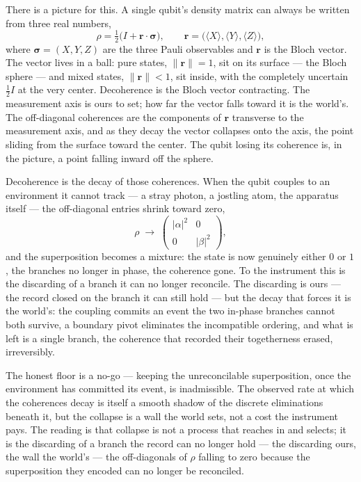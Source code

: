 There is a picture for this. A single qubit's density matrix can always be written from three real numbers,
\begin{equation}
  \rho = \tfrac12\bigl(I + \mathbf{r}\cdot\boldsymbol{\sigma}\bigr), \qquad
  \mathbf{r} = \bigl(\langle X\rangle, \langle Y\rangle, \langle Z\rangle\bigr),
\end{equation}
where $\boldsymbol{\sigma} = (X, Y, Z)$ are the three Pauli observables and $\mathbf{r}$ is the Bloch vector.
The vector lives in a ball: pure states, $\lVert\mathbf{r}\rVert = 1$, sit on its surface --- the Bloch
sphere --- and mixed states, $\lVert\mathbf{r}\rVert < 1$, sit inside, with the completely uncertain $\tfrac12
I$ at the very center. Decoherence is the Bloch vector contracting. The measurement axis is ours to set; how far the vector falls
toward it is the world's. The off-diagonal coherences are the components of $\mathbf{r}$ transverse to the
measurement axis, and as they decay the vector collapses onto the axis, the point sliding from the surface
toward the center. The qubit losing its coherence is, in the
picture, a point falling inward off the sphere.

Decoherence is the decay of those coherences. When the qubit couples to an environment it cannot track --- a
stray photon, a jostling atom, the apparatus itself --- the off-diagonal entries shrink toward zero,
\begin{equation}
  \rho \;\longrightarrow\;
  \begin{pmatrix} |\alpha|^2 & 0 \\ 0 & |\beta|^2 \end{pmatrix},
\end{equation}
and the superposition becomes a mixture: the state is now genuinely either $0$ or $1$, the branches no longer
in phase, the coherence gone. To the instrument this is the discarding of a branch it can no longer
reconcile. The discarding is ours --- the record closed on the branch it can still hold --- but the decay that
forces it is the world's: the coupling commits an event the two in-phase branches cannot both survive, a
boundary pivot eliminates the incompatible ordering, and what is left is a single branch, the coherence that
recorded their togetherness erased, irreversibly.

The honest floor is a no-go --- keeping the unreconcilable superposition, once the environment has committed
its event, is inadmissible. The observed rate at which the coherences decay is itself a smooth shadow of the
discrete eliminations beneath it, but the collapse is a wall the world sets, not a cost the instrument pays.
The reading is that collapse is not a process that reaches in and selects; it is the discarding of a branch the
record can no longer hold --- the discarding ours, the wall the world's --- the off-diagonals of $\rho$ falling
to zero because the superposition they encoded can no longer be reconciled.

